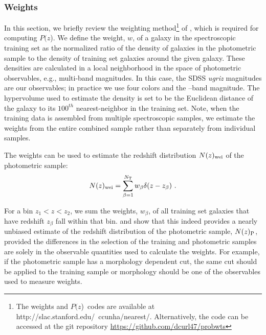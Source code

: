 \documentclass[12pt,preprint]{aastex}
\newcommand{\pofz}{$P(z$)}
\newcommand{\nwei}{N(z)_{\rm wei}}
\begin{document}
\subsubsection{Weights}

In this section, we briefly review the weighting method\footnote{The weights
and \pofz\ codes are available at http://slac.stanford.edu/~ccunha/nearest/.
Alternatively, the code can be accessed at the git repository 
\url{https://github.com/dcurl47/probwts}} of \cite{LimaPhotoz08}, which
is required for computing \pofz.  We define the weight, $w$, of a galaxy in the
spectroscopic training set as the normalized ratio of the density of galaxies
in the photometric sample to the density of training set galaxies around the
given galaxy.  These densities are calculated in a local neighborhood in the
space of photometric observables, e.g., multi-band magnitudes.  In this case,
the SDSS {\it ugriz} magnitudes are our observables; in practice we use four
colors and the \rmag--band magnitude.  The hypervolume used to estimate the
density is set to be the Euclidean distance of the galaxy to its $100^{th}$
nearest-neighbor in the training set.   Note, when the training data is
assembled from multiple spectroscopic samples, we estimate the weights from the
entire combined sample rather than separately from individual samples.


The weights can be used to estimate the redshift distribution $\nwei$ of the
photometric sample:
\begin{equation}  
\nwei = \sum_{\beta=1}^{N_{\rm T}} w_\beta \delta(z-z_\beta)~.
\label{eqn:Nzest}
\end{equation}

\noindent For a bin $z_1 < z < z_2$, we sum the weights, $w_{\beta}$, of all
training set galaxies that have redshift $z_{\beta}$ fall within that bin.
\cite{LimaPhotoz08} and \cite{CunhaPhotoz09} show that this indeed provides a
nearly unbiased estimate of the redshift distribution of the photometric
sample, $N(z)_{\rm P}$, provided the differences in the selection of the
training and photometric samples are solely in the observable quantities used
to calculate the weights.  For example, if the photometric sample has a
morphology dependent cut, the same cut should be applied to the training sample
or morphology should be one of the observables used to measure weights.
\end{document}
